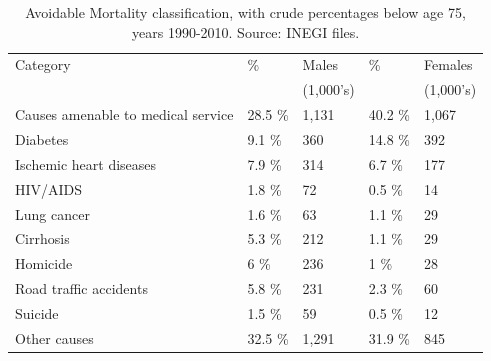 \documentclass[11.5pt]{article}
\begin{document}
\begin{spacing}{1.5}
\begin{table}[ht]
\centering
\caption{Avoidable Mortality classification, 
             with crude percentages below age 75, years 1990-2010. Source: INEGI files.} 
\label{tab:causes}
\begin{tabular}{lllll}
  \hline
Category &\% & Males &  \% & Females \\ 
 && (1,000's) & & (1,000's)\\ 
  \hline
Causes amenable to medical service &                             28.5 \% &                              1,131 &                             40.2 \% &                              1,067 \\ 
                            Diabetes &                              9.1 \% &                                360 &                             14.8 \% &                                392 \\ 
             Ischemic heart diseases &                              7.9 \% &                                314 &                              6.7 \% &                                177 \\ 
                            HIV/AIDS &                              1.8 \% &                                 72 &                              0.5 \% &                                 14 \\ 
                         Lung cancer &                              1.6 \% &                                 63 &                              1.1 \% &                                 29 \\ 
                           Cirrhosis &                              5.3 \% &                                212 &                              1.1 \% &                                 29 \\ 
                            Homicide &                                6 \% &                                236 &                                1 \% &                                 28 \\ 
              Road traffic accidents &                              5.8 \% &                                231 &                              2.3 \% &                                 60 \\ 
                             Suicide &                              1.5 \% &                                 59 &                              0.5 \% &                                 12 \\ 
                        Other causes &                             32.5 \% &                              1,291 &                             31.9 \% &                                845 \\ 
   \hline
\end{tabular}
\end{table}


\end{spacing}
\end{document}
